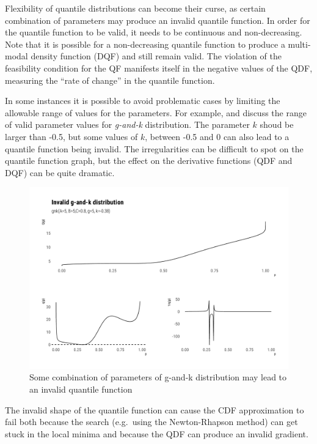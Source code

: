 \documentclass[
  12pt,
]{article}
\begin{document}
Flexibility of quantile distributions can become their curse, as certain combination of parameters may produce an invalid quantile function. In order for the quantile function to be valid, it needs to be continuous and non-decreasing. Note that it is possible for a non-decreasing quantile function to produce a multi-modal density function (DQF) and still remain valid. The violation of the feasibility condition for the QF manifests itself in the negative values of the QDF, measuring the ``rate of change'' in the quantile function.

In some instances it is possible to avoid problematic cases by limiting the allowable range of values for the parameters. For example, \citet{prangle2017GkPackageGandk} and \citet{rayner2002NumericalMaximumLikelihood} discuss the range of valid parameter values for \emph{g-and-k} distribution. The parameter \(k\) shoud be larger than -0.5, but some values of \(k\), between -0.5 and 0 can also lead to a quantile function being invalid. The irregularities can be difficult to spot on the quantile function graph, but the effect on the derivative functions (QDF and DQF) can be quite dramatic.

\begin{figure}

{\centering \includegraphics[width=0.8\linewidth]{ilbm_article_files/figure-latex/invalid-gnk-graph-1} 

}

\caption{Some combination of parameters of g-and-k distribution may lead to an invalid quantile function}\label{fig:invalid-gnk-graph}
\end{figure}

The invalid shape of the quantile function can cause the CDF approximation to fail both because the search (e.g.~using the Newton-Rhapson method) can get stuck in the local minima and because the QDF can produce an invalid gradient.
\end{document}
